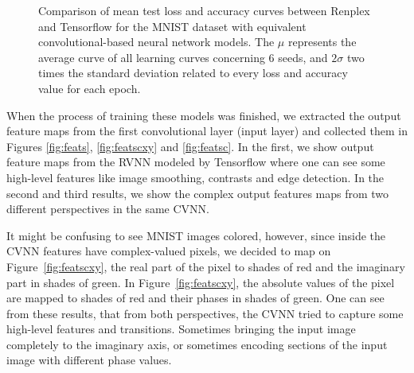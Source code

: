 \begin{figure}[htbp]
	\centering
	\caption{Comparison of mean test loss and accuracy curves between Renplex and Tensorflow for the MNIST dataset with equivalent convolutional-based neural network models. The $ \mu $ represents the average curve of all learning curves concerning 6 seeds, and $ 2\sigma $ two times the standard deviation related to every loss and accuracy value for each epoch.}
	\label{fig:comp_cnn_mnist}
\end{figure}

When the process of training these models was finished, we extracted the output feature maps from the first convolutional layer (input layer) and collected them in Figures \ref{fig:feats},  \ref{fig:featscxy} and \ref{fig:featsc}. In the first, we show output feature maps from the RVNN modeled by Tensorflow where one can see some high-level features like image smoothing, contrasts and edge detection. In the second and third results, we show the complex output features maps from two different perspectives in the same CVNN. 

It might be confusing to see MNIST images colored, however, since inside the CVNN features have complex-valued pixels, we decided to map on Figure~\ref{fig:featscxy}, the real part of the pixel to shades of red and the imaginary part in shades of green. In Figure~\ref{fig:featscxy}, the absolute values of the pixel are mapped to shades of red and their phases in shades of green. One can see from these results, that from both perspectives, the CVNN tried to capture some high-level features and transitions. Sometimes bringing the input image completely to the imaginary axis, or sometimes encoding sections of the input image with different phase values.

